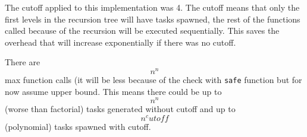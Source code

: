 \documentclass[12pt]{article}
\begin{document}
The cutoff applied to this implementation was 4. The cutoff means that only the first levels in the recursion tree will have tasks spawned, the rest of the functions called because of the recursion will be executed sequentially. This saves the overhead that will increase exponentially if there was no cutoff.

There are \[ n^n \] max function calls (it will be less because of the check with {\tt safe} function but for now assume upper bound. This means there could be up to \[ n^n \] (worse than factorial) tasks generated without cutoff and up to \[ n^cutoff \] (polynomial) tasks spawned with cutoff.
\end{document}
